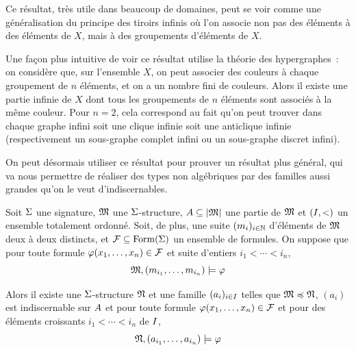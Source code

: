 Ce résultat, très utile dans beaucoup de domaines, peut se voir comme une
généralisation du principe des tiroirs infinis où l'on associe non pas des
éléments à des éléments de $X$, mais à des groupements d'éléments de $X$.

Une façon plus intuitive de voir ce résultat utilise la théorie des
hypergraphes~: on considère que, sur l'ensemble $X$, on peut associer des
couleurs à chaque groupement de $n$ éléments, et on a un nombre fini de
couleurs. Alors il existe une partie infinie de $X$ dont tous les groupements de
$n$ éléments sont associés à la même couleur. Pour $n = 2$, cela correspond au
fait qu'on peut trouver dans chaque graphe infini soit une clique infinie soit
une anticlique infinie (respectivement un sous-graphe complet infini ou un
sous-graphe discret infini).

On peut désormais utiliser ce résultat pour prouver un résultat plus général,
qui va nous permettre de réaliser des types non algébriques par des familles
aussi grandes qu'on le veut d'indiscernables.

\begin{theorem}
  Soit $\Sigma$ une signature, $\mathfrak{M}$ une $\Sigma$-structure,
  $A\subseteq\left\vert \mathfrak{M}\right\vert$ une partie de $\mathfrak{M}$ et $(I,<)$ un
  ensemble totalement ordonné. Soit, de plus, une suite $(m_i)_{i \in \mathbb N}$
  d'éléments de $\mathfrak{M}$ deux à deux distincts, et
  $\mathcal F\subseteq\operatorname{Form}(\Sigma)$ un ensemble de formules. On suppose que
  pour toute formule $\varphi(x_1,\ldots,x_n)\in\mathcal F$ et suite d'entiers
  $i_1 < \cdots < i_n$,
  \[\mathfrak{M},(m_{i_1},\ldots,m_{i_n})\models\varphi\]

  Alors il existe une $\Sigma$-structure $\mathfrak{N}$ et une famille
  $(a_i)_{i \in I}$ telles que $\mathfrak{M}\preccurlyeq\mathfrak{N}$,
  $(a_i)$ est indiscernable sur $A$ et pour toute formule
  $\varphi(x_1,\ldots,x_n)\in\mathcal F$ et pour des éléments croissants
  $i_1 < \cdots < i_n$ de $I$,
  \[\mathfrak{N},(a_{i_1},\ldots,a_{i_n})\models\varphi\]
\end{theorem}


